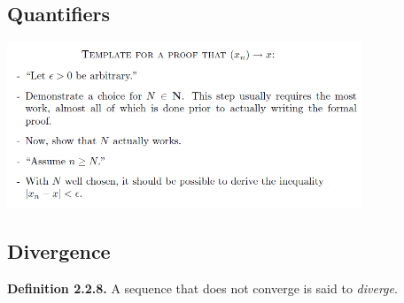     \subsection*{Quantifiers}
        \begin{center}
            \includegraphics[width=300pt]{template.png}
        \end{center}
    \subsection*{Divergence}
        \textbf{Definition 2.2.8.} A sequence that does not converge is said to \textit{diverge}.
        